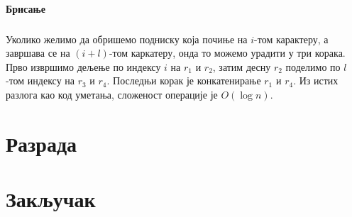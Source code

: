 \documentclass[12pt,oneside]{memoir}
\begin{document}
\subsubsection{Брисање}
\paragraph{}
Уколико желимо да обришемо подниску која почиње на \(i\)-том карактеру, а завршава се на
\((i+l)\)-том каркатеру, онда то можемо урадити у три корака. Прво извршимо дељење по индексу 
\(i\) на \(r_1\) и \(r_2\), затим десну \(r_2\) поделимо по \(l\)-том индексу на \(r_3\)
и \(r_4\). Последњи корак је конкатенирање \(r_1\) и \(r_4\). Из истих разлога као код
уметања, сложеност операције је \(O(\log{}n)\).

\chapter{Разрада}
\label{chp:razrada}

\pangrami

\pangrami

\chapter{Закључак}
\pangrami

\pangrami

\literatura

\backmatter
\end{document}
